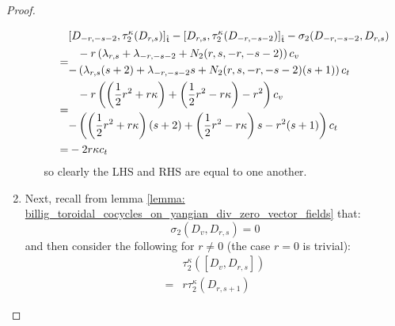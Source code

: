 \begin{proof}
\begin{enumerate}
\begin{enumerate}
$$\begin{aligned}
                                    & [D_{-r, -s - 2}, \tau_2^{\kappa}(D_{r, s})]_{\extendedtoroidal} - [D_{r, s}, \tau_2^{\kappa}(D_{-r, -s - 2})]_{\extendedtoroidal} - \sigma_2(D_{-r, -s - 2}, D_{r, s})
                                    \\
                                    = &
                                    \begin{aligned}
                                        & -r\left( \lambda_{r, s} + \lambda_{-r, -s - 2} + N_2(r, s, -r, -s - 2) \right) c_v
                                        \\
                                        - & \left( \lambda_{r, s} (s + 2) + \lambda_{-r, -s - 2} s + N_2(r, s, -r, -s - 2) (s + 1) \right) c_t
                                    \end{aligned}
                                    \\
                                    = &
                                    \begin{aligned}
                                        & -r \left( \left( \frac12 r^2 + r \kappa \right) + \left( \frac12 r^2 - r \kappa \right) - r^2\right) c_v
                                        \\
                                        - & \left( \left( \frac12 r^2 + r \kappa \right) (s + 2) + \left( \frac12 r^2 - r \kappa \right) s - r^2 (s + 1) \right) c_t
                                    \end{aligned}
                                    \\
                                    = & -2r \kappa c_t
                                \end{aligned}
                            $$
                        so clearly the LHS and RHS are equal to one another.
                    \end{enumerate}
                    \item Next, recall from lemma \ref{lemma: billig_toroidal_cocycles_on_yangian_div_zero_vector_fields} that:
                        $$\sigma_2(D_v, D_{r, s}) = 0$$
                    and then consider the following for $r \not = 0$ (the case $r = 0$ is trivial):
                        $$
                            \begin{aligned}
                                & \tau_2^{\kappa}([D_v, D_{r, s}])
                                \\
                                = & r\tau_2^{\kappa}(D_{r, s + 1})

\end{aligned}$$
\end{enumerate}
\end{proof}
